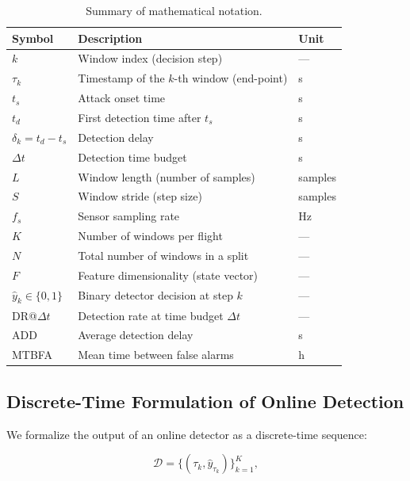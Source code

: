 \documentclass{ieeeaccess}
\begin{document}
\begin{table}[!t]
\caption{Summary of mathematical notation.}
\label{tab:notation}
\centering
\begin{tabular}{lll}
\toprule
\textbf{Symbol} & \textbf{Description} & \textbf{Unit} \\
\midrule
$k$          & Window index (decision step)          & --- \\
$\tau_k$     & Timestamp of the $k$-th window (end-point) & s \\
$t_s$        & Attack onset time                     & s \\
$t_d$        & First detection time after $t_s$      & s \\
$\delta_k = t_d - t_s$ & Detection delay             & s \\
$\Delta t$   & Detection time budget                 & s \\
$L$          & Window length (number of samples)     & samples \\
$S$          & Window stride (step size)             & samples \\
$f_s$        & Sensor sampling rate                  & Hz \\
$K$          & Number of windows per flight          & --- \\
$N$          & Total number of windows in a split    & --- \\
$F$          & Feature dimensionality (state vector) & --- \\
$\hat{y}_k \in \{0,1\}$ & Binary detector decision at step $k$ & --- \\
DR@$\Delta t$  & Detection rate at time budget $\Delta t$ & --- \\
ADD & Average detection delay               & s \\
MTBFA & Mean time between false alarms      & h \\
\bottomrule
\end{tabular}
\end{table}

\subsection{Discrete-Time Formulation of Online Detection}

We formalize the output of an online detector as a discrete-time sequence:

\begin{equation}
\mathcal{D} = \{(\tau_k, \hat{y}_{\tau_k})\}_{k=1}^K,
\end{equation}
\end{document}
